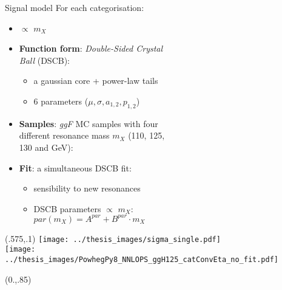 \documentclass[10pt,UKenglish, leqno, xcolor = dvipsnames]{beamer}
\begin{document}
	\begin{frame}{Signal model}
		\vfill
		For each categorisation:
		\begin{itemize}
			\item $\propto$ $m_X$
			\item \textbf{Function form}: \textit{Double-Sided Crystal\\ Ball} (DSCB):
			\begin{itemize}
				\item a gaussian core + power-law tails
				\item 6 parameters ($\mu, \sigma, a_{1,2}, p_{1,2}$)
			\end{itemize}
			\item \textbf{Samples}: \textit{ggF} MC samples with four\\ different resonance mass $m_X$ (110, 125,\\ 130 and GeV):
			\item \textbf{Fit}: a simultaneous DSCB fit:
			\begin{itemize}
				\item sensibility to new resonances
				\item DSCB parameters $\propto$ $m_X$:\\
				$par(m_X) = A^{par} + B^{par}\cdot m_X$
			\end{itemize}
		\end{itemize}
		\vspace{.5cm}
		\vfill
		\begin{textblock}{1}(.575,.1)
			\texttt{[image: ../thesis\_images/sigma\_single.pdf]}\\
			\texttt{[image: ../thesis\_images/PowhegPy8\_NNLOPS\_ggH125\_catConvEta\_no\_fit.pdf]}\\	
		\end{textblock}	
		\begin{textblock}{1}(0.,.85)
			\begin{figure}
			\end{figure}
		\end{textblock}
	\end{frame}
	
\end{document}
